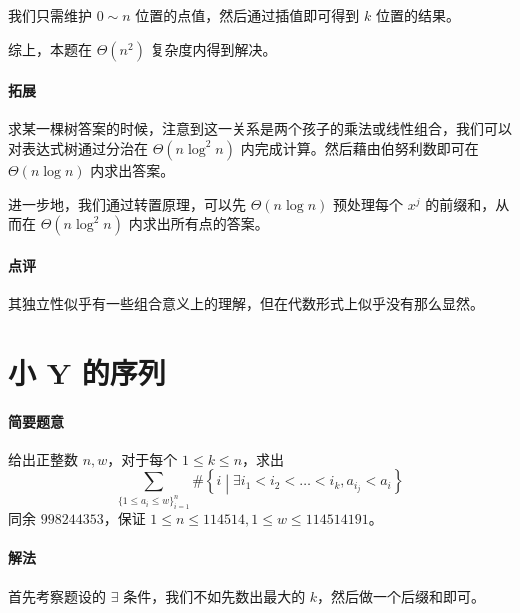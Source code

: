 \documentclass[12pt]{ctexart}
\theoremstyle{theorem}
\theoremstyle{theorem}
\begin{document}
我们只需维护 $0\sim n$ 位置的点值，然后通过插值即可得到 $k$ 位置的结果。

综上，本题在 $\Theta(n^2)$ 复杂度内得到解决。

\paragraph{拓展} 求某一棵树答案的时候，注意到这一关系是两个孩子的乘法或线性组合，我们可以对表达式树通过分治在 $\Theta(n\log ^2 n)$ 内完成计算。然后藉由伯努利数即可在 $\Theta(n\log n)$ 内求出答案。

进一步地，我们通过转置原理，可以先 $\Theta(n\log n)$ 预处理每个 $x^j$ 的前缀和，从而在 $\Theta(n\log^2n)$ 内求出所有点的答案。

\paragraph{点评} 其独立性似乎有一些组合意义上的理解，但在代数形式上似乎没有那么显然。

\newpage

\section{小 Y 的序列}

\paragraph{简要题意}

给出正整数 $n, w$，对于每个 $1\le k\le n$，求出
$$
\sum_{\{1\le a_i\le w\}_{i=1}^n} \# \left\{
i \middle \vert \exists i_1<i_2<\dots <i_k, a_{i_j} < a_i
\right \}
$$
同余 $998244353$，保证 $1\le n\le 114514, 1\le w\le 114514191$。

\paragraph{解法}

首先考察题设的 $\exists$ 条件，我们不如先数出最大的 $k$，然后做一个后缀和即可。
\end{document}
